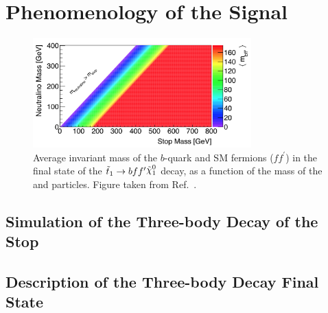 \section{Phenomenology of the Signal}
\label{sec:stop_pheno}

\begin{figure}[!htb]
    \begin{center}
        \includegraphics[width=0.75\textwidth]{figures/search_stop2l/nachman_stop_phase_space}
        \caption{
            Average invariant mass of the $b$-quark and SM fermions ($f f^{\prime}$) in the
            final state of the $\stopone \rightarrow b f f^{\prime} \ninoone$ decay, as a function of the mass
            of the \stopone and \ninoone particles.
            Figure taken from Ref.~\cite{Nachman:2016qyc}.
        }
        \label{fig:stop_phase_space}
    \end{center}
\end{figure}

\subsection{Simulation of the Three-body Decay of the Stop}
\label{sec:stop_sim}



\cite{Belanger:2012tm,Perelstein:2008zt,Low:2013aza}

\subsection{Description of the Three-body Decay Final State}
\label{sec:stop_final_state}
